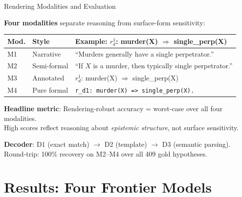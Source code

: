 \documentclass[aspectratio=169]{beamer}
\newcommand{\defto}{\Rightarrow}
\begin{document}
\begin{frame}{Rendering Modalities and Evaluation}

\small
\textbf{Four modalities} separate reasoning from surface-form sensitivity:

\vspace{0.3em}
\footnotesize
\begin{tabular}{@{}llp{6.5cm}@{}}
\toprule
\textbf{Mod.} & \textbf{Style} & \textbf{Example}: $r_d^1$: murder(X) $\defto$ single\_perp(X) \\
\midrule
M1 & Narrative & ``Murders generally have a single perpetrator.'' \\
M2 & Semi-formal & ``If $X$ is a murder, then typically single perpetrator.'' \\
M3 & Annotated & $r_d^1$: murder(X) $\defto$ single\_perp(X) \; [defeasible] \\
M4 & Pure formal & \texttt{r\_d1: murder(X) => single\_perp(X).} \\
\bottomrule
\end{tabular}

\small
\vspace{0.4em}
\textbf{Headline metric}: Rendering-robust accuracy = worst-case over all four modalities.\\[3pt]
High scores reflect reasoning about \textit{epistemic structure}, not surface sensitivity.

\vspace{0.3em}
\textbf{Decoder}: D1 (exact match) $\to$ D2 (template) $\to$ D3 (semantic parsing).\\
Round-trip: 100\% recovery on M2--M4 over all 409 gold hypotheses.
\end{frame}


\section{Results: Four Frontier Models}
\end{document}
